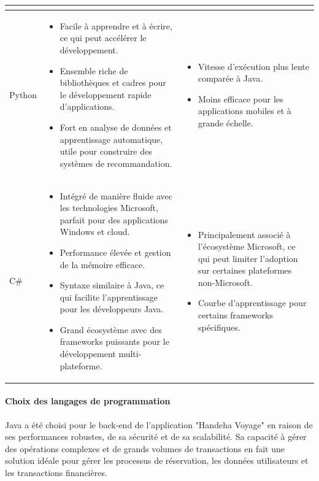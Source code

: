 \documentclass[12pt]{report}
\begin{document}
\begin{longtable}{|p{3cm}|p{5.5cm}|p{5.5cm}|}
\begin{itemize}
						\end{itemize} \\
						\hline
						Python &
						\begin{itemize}
							\item Facile à apprendre et à écrire, ce qui peut accélérer le développement.
							\item Ensemble riche de bibliothèques et cadres pour le développement rapide d'applications.
							\item Fort en analyse de données et apprentissage automatique, utile pour construire des systèmes de recommandation.
						\end{itemize} &
						\begin{itemize}
							\item Vitesse d'exécution plus lente comparée à Java.
							\item Moins efficace pour les applications mobiles et à grande échelle.
						\end{itemize} \\
						\hline
						C\# &
						\begin{itemize}
							\item Intégré de manière fluide avec les technologies Microsoft, parfait pour des applications Windows et cloud.
							\item Performance élevée et gestion de la mémoire efficace.
							\item Syntaxe similaire à Java, ce qui facilite l'apprentissage pour les développeurs Java.
							\item Grand écosystème avec des frameworks puissants pour le développement multi-plateforme.
						\end{itemize} &
						\begin{itemize}
							\item Principalement associé à l'écosystème Microsoft, ce qui peut limiter l'adoption sur certaines plateformes non-Microsoft.
							\item Courbe d'apprentissage pour certains frameworks spécifiques.
						\end{itemize} \\
						\hline
				    \end{longtable}

				\paragraph{Choix des langages de programmation} 

				Java a été choisi pour le back-end de l'application "Handeha Voyage" en raison de ses performances robustes, de sa sécurité et de sa scalabilité. Sa capacité à gérer des opérations complexes et de grands volumes de transactions en fait une solution idéale pour gérer les processus de réservation, les données utilisateurs et les transactions financières.
\end{document}
